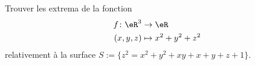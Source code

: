 
\begin{exercice}\label{exoVariete0005}

Trouver les extrema de la fonction 
\begin{equation}
	\begin{aligned}
		f\colon \eR^3&\to \eR \\
		(x,y,z)&\mapsto x^2+y^2+z^2 
	\end{aligned}
\end{equation}
relativement à la surface $S := \{ z^2 = x^2 + y^2 + xy + x + y + z + 1 \}$.


\end{exercice}
